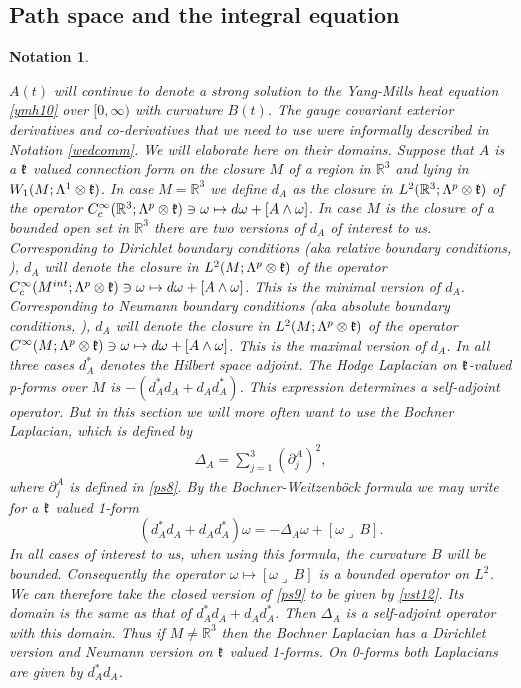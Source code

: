 \documentclass[12pt]{article}
\newtheorem{notation}[theorem]{Notation}
\def \L{\Lambda}
\def \R{\mathbb R}
\def \w{\omega}
\def \kf{\frak k}
\def \p{\partial}
\def \beq{\begin{equation}}
\def \eeq{\end{equation}}
\def \eref{\eqref}
\def \lrc{\lrcorner\,}
\numberwithin{equation}{section}
\begin{document}
\subsection{Path space and the integral equation } \label{secps}

\begin{notation}\label{notSob}{\rm  $A(t)$ will continue to denote  a strong solution to the Yang-Mills
 heat equation  \eref{ymh10} over $[0, \infty)$ with curvature $B(t)$.
 The gauge covariant exterior derivatives and co-derivatives that we need to use 
 were informally described in Notation \ref{wedcomm}.
We will elaborate here on their domains.
 Suppose that $A$ is a $\kf$ valued connection form on the closure $M$ of a region
 in $\R^3$ and lying in $W_1(M; \L^1\otimes \kf)$. In case $M = \R^3$ we define $d_A$ as the closure 
 in $L^2(\R^3; \L^p\otimes \kf)$ of the operator 
 $C_c^\infty(\R^3;\L^p\otimes \kf) \ni \w \mapsto d\w + [A\wedge \w]$.
  In case $M$ is the closure of a bounded open set in $\R^3$
 there are two versions of $d_A$ of interest to us. Corresponding to Dirichlet boundary conditions 
 (aka relative boundary conditions, \cite{RaS}), $d_A$ will denote the closure in $L^2(M; \L^p\otimes \kf)$ 
 of the operator    $C_c^\infty(M^{int};\L^p\otimes \kf) \ni \w \mapsto d\w + [A\wedge \w]$.
 This is the minimal version of $d_A$. Corresponding to Neumann boundary conditions 
 (aka absolute boundary conditions,  \cite{RaS}), $d_A$ will denote the closure in $L^2(M; \L^p\otimes \kf)$ 
 of the operator    $C^\infty(M;\L^p\otimes \kf) \ni \w \mapsto d\w + [A\wedge \w]$. 
 This is the maximal version of $d_A$. In all three cases $d_A^*$ denotes the Hilbert space adjoint.
 The Hodge Laplacian on $\kf$-valued p-forms over $M$ is $-(d_A^* d_A + d_A d_A^*)$. 
 This expression determines   a self-adjoint operator. But in this section we will more often want to
 use the Bochner Laplacian, which is defined by
 \begin{align}
\Delta_A = \sum_{j=1}^3 (\p_j^A)^2 ,     \label{ps9}
\end{align}
where $\p_j^A$ is defined in \eref{ps8}.
By the  Bochner-Weitzenb\"ock formula  we may write  for a $\kf$ valued 1-form 
\beq
(d_A^* d_A  +d_Ad_A^*)\w = -\Delta_{A} \w + [\w\lrc B].        \label{vst12}
\eeq
In all cases of interest to us, when using this formula, the curvature $B$ will be bounded.  
Consequently the operator $\w\mapsto [\w\lrc B]$ is  
 a bounded operator on $L^2$. 
We can therefore take  the closed version of \eref{ps9} to be given by \eref{vst12}. 
Its domain is the same as that of   $d_A^* d_A  +d_Ad_A^*$.
Then $\Delta_A$ is a self-adjoint operator with this domain.  Thus if $M \ne \R^3$ then the Bochner
Laplacian has a Dirichlet version and Neumann version on $\kf$ valued 1-forms.
On 0-forms both Laplacians are given by $d_A^*d_A$.
 
}
\end{notation}
\end{document}
